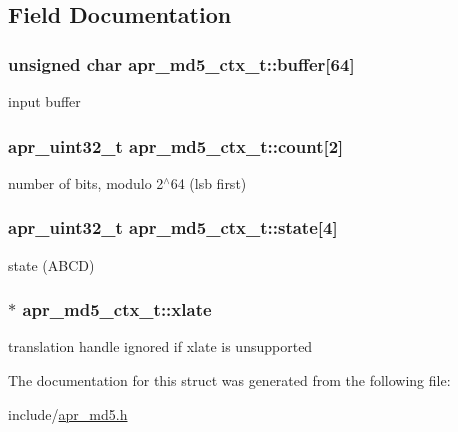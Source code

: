 \subsection{Field Documentation}
\hypertarget{structapr__md5__ctx__t_aed43a8aefc65c8973dbae804c94ad1e3}{
\subsubsection[{buffer}]{\setlength{\rightskip}{0pt plus 5cm}unsigned char apr\-\_\-md5\-\_\-ctx\-\_\-t\-::buffer\mbox{[}64\mbox{]}}}\label{structapr__md5__ctx__t_aed43a8aefc65c8973dbae804c94ad1e3}
input buffer \hypertarget{structapr__md5__ctx__t_a3234a76e68a4ef546026a9854f9ba6d0}{
\subsubsection[{count}]{\setlength{\rightskip}{0pt plus 5cm}apr\-\_\-uint32\-\_\-t apr\-\_\-md5\-\_\-ctx\-\_\-t\-::count\mbox{[}2\mbox{]}}}\label{structapr__md5__ctx__t_a3234a76e68a4ef546026a9854f9ba6d0}
number of bits, modulo 2$^\wedge$64 (lsb first) \hypertarget{structapr__md5__ctx__t_ab8acbc6cd7a3dcd16e66e64a7f5357b5}{
\subsubsection[{state}]{\setlength{\rightskip}{0pt plus 5cm}apr\-\_\-uint32\-\_\-t apr\-\_\-md5\-\_\-ctx\-\_\-t\-::state\mbox{[}4\mbox{]}}}\label{structapr__md5__ctx__t_ab8acbc6cd7a3dcd16e66e64a7f5357b5}
state (A\-B\-C\-D) \hypertarget{structapr__md5__ctx__t_a391a62bc9e7fada71d03f786df4f49ba}{
\subsubsection[{xlate}]{$\ast$ apr\-\_\-md5\-\_\-ctx\-\_\-t\-::xlate}}\label{structapr__md5__ctx__t_a391a62bc9e7fada71d03f786df4f49ba}
translation handle ignored if xlate is unsupported 

The documentation for this struct was generated from the following file\-:\begin{DoxyCompactItemize}
\item 
include/\hyperlink{apr__md5_8h}{apr\-\_\-md5.\-h}\end{DoxyCompactItemize}
